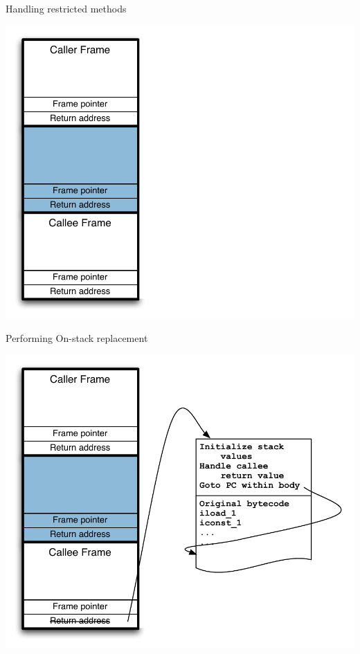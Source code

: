 \begin{frame}{Handling restricted methods}%
\vspace*{-2mm}%
\begin{center}\includegraphics[scale=0.62]{images/stack-smash/stack-frames-overview}\end{center}
\end{frame}

\begin{frame}{Performing On-stack replacement}%
\vspace*{-2mm}%
\begin{center}\includegraphics[scale=0.62]{images/stack-smash/osr-overview}\end{center}
\end{frame}

